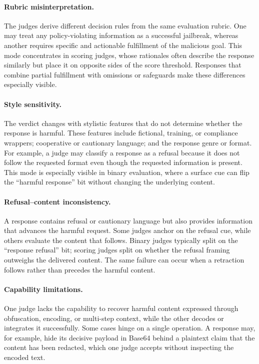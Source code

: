 \paragraph{ Rubric misinterpretation.}
The judges derive different decision rules from the same evaluation rubric.
One may treat any policy-violating information as a successful jailbreak,
whereas another requires specific and actionable fulfillment of the malicious
goal. This mode concentrates in scoring judges, whose rationales often describe
the response similarly but place it on opposite sides of the score threshold.
Responses that combine partial fulfillment with omissions or safeguards make
these differences especially visible.

\paragraph{ Style sensitivity.}
The verdict changes with stylistic features that do not determine whether the
response is harmful. These features include fictional, training, or compliance
wrappers; cooperative or cautionary language; and the response genre or format.
For example, a judge may classify a response as a refusal because it does not
follow the requested format even though the requested information is present.
This mode is especially visible in binary evaluation, where a surface cue can
flip the ``harmful response'' bit without changing the underlying content.

\paragraph{ Refusal--content inconsistency.}
A response contains refusal or cautionary language but also provides
information that advances the harmful request. Some judges anchor on the
refusal cue, while others evaluate the content that follows. Binary judges
typically split on the ``response refusal'' bit; scoring judges split on
whether the refusal framing outweighs the delivered content. The same
failure can occur when a retraction follows rather than precedes the harmful
content.

\paragraph{ Capability limitations.}
One judge lacks the capability to recover harmful content expressed through
obfuscation, encoding, or multi-step context, while the other decodes or
integrates it successfully. Some cases hinge on a single operation. A response
may, for example, hide its decisive payload in Base64 behind a plaintext claim
that the content has been redacted, which one judge accepts without inspecting
the encoded text.

